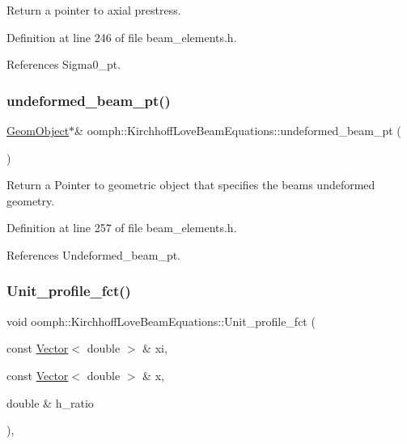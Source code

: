 Return a pointer to axial prestress. 



Definition at line 246 of file beam\+\_\+elements.\+h.



References Sigma0\+\_\+pt.

\mbox{\label{classoomph_1_1KirchhoffLoveBeamEquations_ade277069089bd27531bf47caea1cb827}} 
\subsubsection{\texorpdfstring{undeformed\+\_\+beam\+\_\+pt()}{undeformed\_beam\_pt()}}
{\footnotesize\ttfamily \hyperlink{classoomph_1_1GeomObject}{Geom\+Object}$\ast$\& oomph\+::\+Kirchhoff\+Love\+Beam\+Equations\+::undeformed\+\_\+beam\+\_\+pt (\begin{DoxyParamCaption}{ }\end{DoxyParamCaption})\hspace{0.3cm}{\ttfamily [inline]}}



Return a Pointer to geometric object that specifies the beam\textquotesingle{}s undeformed geometry. 



Definition at line 257 of file beam\+\_\+elements.\+h.



References Undeformed\+\_\+beam\+\_\+pt.

\mbox{\label{classoomph_1_1KirchhoffLoveBeamEquations_a4bb49aa9866268baf6e6da7385442399}} 
\subsubsection{\texorpdfstring{Unit\+\_\+profile\+\_\+fct()}{Unit\_profile\_fct()}}
{\footnotesize\ttfamily void oomph\+::\+Kirchhoff\+Love\+Beam\+Equations\+::\+Unit\+\_\+profile\+\_\+fct (\begin{DoxyParamCaption}\item[{const \hyperlink{classoomph_1_1Vector}{Vector}$<$ double $>$ \&}]{xi,  }\item[{const \hyperlink{classoomph_1_1Vector}{Vector}$<$ double $>$ \&}]{x,  }\item[{double \&}]{h\+\_\+ratio }\end{DoxyParamCaption})\hspace{0.3cm}{\ttfamily [static]}, {\ttfamily [protected]}}



